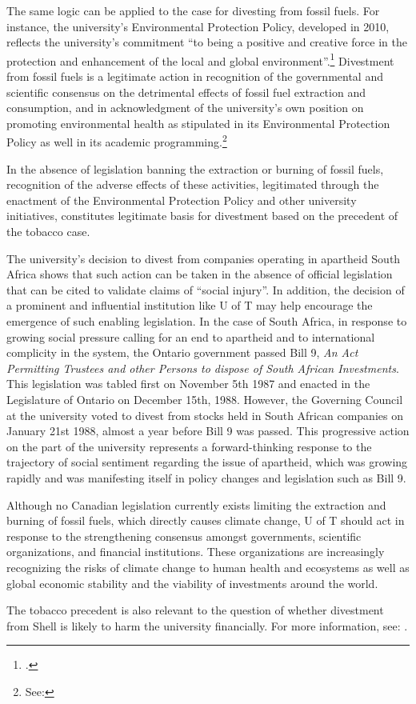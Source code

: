 The same logic can be applied to the case for divesting from fossil fuels. 
For instance, the university's Environmental Protection Policy, developed in 2010, reflects the university's commitment ``to being a positive and creative force in the protection and enhancement of the local and global environment''.\footcite[][]{UTEnvProtectionPolicy}
Divestment from fossil fuels is a legitimate action in recognition of the governmental and scientific consensus on the detrimental effects of fossil fuel extraction and consumption, and in acknowledgment of the university's own position on promoting environmental health as stipulated in its Environmental Protection Policy as well in its academic programming.\footnote{See: }



In the absence of legislation banning the extraction or burning of fossil fuels, recognition of the adverse effects of these activities, legitimated through the enactment of the Environmental Protection Policy and other university initiatives, constitutes legitimate basis for divestment based on the precedent of the tobacco case.  



The university's decision to divest from companies operating in apartheid South Africa shows that such action can be taken in the absence of official legislation that can be cited to validate claims of ``social injury''.
In addition, the decision of a prominent and influential institution like U of T may help encourage the emergence of such enabling legislation.
In the case of South Africa, in response to growing social pressure calling for an end to apartheid and to international complicity in the system, the Ontario government passed Bill 9, \emph{An Act Permitting Trustees and other Persons to dispose of South African Investments}.
This legislation was tabled first on November 5th 1987 and enacted in the Legislature of Ontario on December 15th, 1988. 
However, the Governing Council at the university voted to divest from stocks held in South African companies on January 21st 1988, almost a year before Bill 9 was passed. 
This progressive action on the part of the university represents a forward-thinking response to the trajectory of social sentiment regarding the issue of apartheid, which was growing rapidly and was manifesting itself in policy changes and legislation such as Bill 9. 



Although no Canadian legislation currently exists limiting the extraction and burning of fossil fuels, which directly causes climate change, U of T should act in response to the strengthening consensus amongst governments, scientific organizations, and financial institutions. These organizations are increasingly recognizing the risks of climate change to human health and ecosystems as well as global economic stability and the viability of investments around the world.



The tobacco precedent is also relevant to the question of whether divestment from Shell is likely to harm the university financially. For more information, see: .



